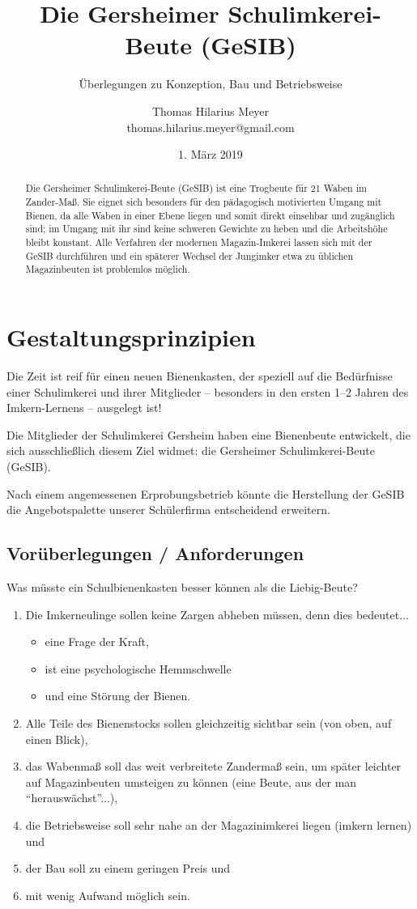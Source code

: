 \documentclass[12pt,a4paper,ngerman]{scrartcl}
\author{Thomas Hilarius Meyer\\ \textsf{thomas.hilarius.meyer@gmail.com}}
\title{Die Gersheimer Schulimkerei-Beute (GeSIB)}
\subtitle{Überlegungen zu Konzeption, Bau und Betriebsweise}
\date{1. März 2019}
\begin{document}
\maketitle


\begin{abstract}
  Die Gersheimer Schulimkerei-Beute (GeSIB) ist eine Trogbeute für 21 Waben im Zander-Maß.
  Sie eignet sich besonders für den pädagogisch motivierten Umgang mit Bienen, da alle Waben in einer
  Ebene liegen und somit direkt einsehbar und zugänglich sind; im Umgang mit ihr sind
  keine schweren Gewichte zu heben und die Arbeitshöhe bleibt konstant.
  Alle Verfahren der modernen Magazin-Imkerei lassen sich mit der GeSIB durchführen und
  ein späterer Wechsel der Jungimker etwa zu üblichen Magazinbeuten ist problemlos möglich.
\end{abstract}


\section{Gestaltungsprinzipien}

Die Zeit ist reif für einen neuen Bienenkasten, der speziell auf die Bedürfnisse einer Schulimkerei und ihrer Mitglieder --
besonders in den ersten 1--2 Jahren des Imkern-Lernens -- ausgelegt ist!

Die Mitglieder der Schulimkerei Gersheim haben eine Bienenbeute entwickelt, die sich ausschließlich diesem Ziel widmet:
die Gersheimer Schulimkerei-Beute (GeSIB).

Nach einem angemessenen Erprobungsbetrieb könnte die Herstellung der GeSIB die Angebotspalette unserer
Schülerfirma entscheidend erweitern.


\subsection{Vorüberlegungen / Anforderungen}

Was müsste ein Schulbienenkasten besser können als die Liebig-Beute?

\begin{enumerate}
\item Die Imkerneulinge sollen keine Zargen abheben müssen, denn dies bedeutet...
  \begin{itemize}
  \item eine Frage der Kraft,
  \item ist eine psychologische Hemmschwelle
  \item  und eine Störung der Bienen.
  \end{itemize}
\item Alle Teile des Bienenstocks sollen gleichzeitig sichtbar sein (von oben, auf einen Blick),
\item das Wabenmaß soll das weit verbreitete Zandermaß sein,
  um später leichter auf Magazinbeuten umsteigen zu können (eine Beute, aus der man \enquote{herauswächst}...),
\item die Betriebsweise soll sehr nahe an der Magazinimkerei liegen (imkern lernen) und
\item der Bau soll zu einem geringen Preis und
\item mit wenig Aufwand möglich sein.
\end{enumerate}
\end{document}
